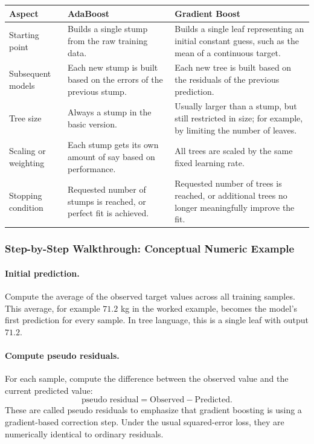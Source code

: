 \documentclass[12pt,openany]{book}
\begin{document}
\begin{center}
\begin{tabular}{|L{0.20\textwidth}|L{0.34\textwidth}|L{0.34\textwidth}|}
\hline
\textbf{Aspect} & \textbf{AdaBoost} & \textbf{Gradient Boost} \\
\hline
Starting point & Builds a single stump from the raw training data. & Builds a single leaf representing an initial constant guess, such as the mean of a continuous target. \\
\hline
Subsequent models & Each new stump is built based on the errors of the previous stump. & Each new tree is built based on the residuals of the previous prediction. \\
\hline
Tree size & Always a stump in the basic version. & Usually larger than a stump, but still restricted in size; for example, by limiting the number of leaves. \\
\hline
Scaling or weighting & Each stump gets its own amount of say based on performance. & All trees are scaled by the same fixed learning rate. \\
\hline
Stopping condition & Requested number of stumps is reached, or perfect fit is achieved. & Requested number of trees is reached, or additional trees no longer meaningfully improve the fit. \\
\hline
\end{tabular}
\end{center}

\subsubsection{Step-by-Step Walkthrough: Conceptual Numeric Example}

\paragraph{Initial prediction.}
Compute the average of the observed target values across all training samples. This average, for example \(71.2\) kg in the worked example, becomes the model's first prediction for every sample. In tree language, this is a single leaf with output \(71.2\).

\paragraph{Compute pseudo residuals.}
For each sample, compute the difference between the observed value and the current predicted value:
\begin{equation*}
    \text{pseudo residual} = \text{Observed} - \text{Predicted}.
\end{equation*}
These are called pseudo residuals to emphasize that gradient boosting is using a gradient-based correction step. Under the usual squared-error loss, they are numerically identical to ordinary residuals.
\end{document}
